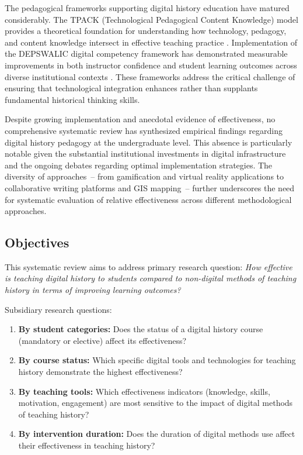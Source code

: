 \documentclass[
hf,
]{ceurart}
\begin{document}
The pedagogical frameworks supporting digital history education have matured considerably. The TPACK (Technological Pedagogical Content Knowledge) model provides a theoretical foundation for understanding how technology, pedagogy, and content knowledge intersect in effective teaching practice \cite{Koh2013, Ali2023}. Implementation of the DEPSWALIC digital competency framework has demonstrated measurable improvements in both instructor confidence and student learning outcomes across diverse institutional contexts \cite{Joshi2021, Hastomo2024}. These frameworks address the critical challenge of ensuring that technological integration enhances rather than supplants fundamental historical thinking skills.

Despite growing implementation and anecdotal evidence of effectiveness, no comprehensive systematic review has synthesized empirical findings regarding digital history pedagogy at the undergraduate level. This absence is particularly notable given the substantial institutional investments in digital infrastructure and the ongoing debates regarding optimal implementation strategies. The diversity of approaches~-- from gamification and virtual reality applications to collaborative writing platforms and GIS mapping~-- further underscores the need for systematic evaluation of relative effectiveness across different methodological approaches.

\subsection{Objectives}

This systematic review aims to address primary research question: \textit{How effective is teaching digital history to students compared to non-digital methods of teaching history in terms of improving learning outcomes?}

{Subsidiary research questions:}

\begin{enumerate}
    \item \textbf{By student categories:} Does the status of a digital history course (mandatory or elective) affect its effectiveness?
    \item \textbf{By course status:} Which specific digital tools and technologies for teaching history demonstrate the highest effectiveness?
    \item \textbf{By teaching tools:} Which effectiveness indicators (knowledge, skills, motivation, engagement) are most sensitive to the impact of digital methods of teaching history?
    \item \textbf{By intervention duration:} Does the duration of digital methods use affect their effectiveness in teaching history?
\end{enumerate}
\end{document}
